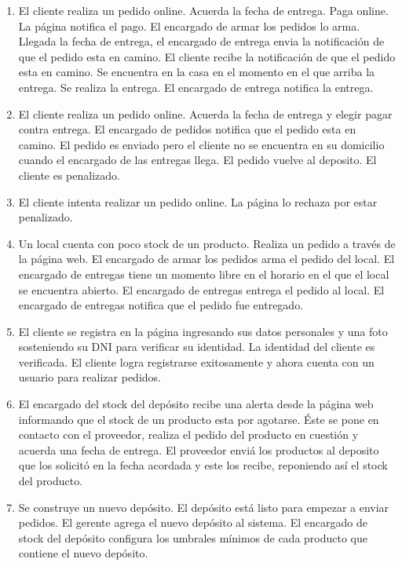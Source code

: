 \begin{enumerate}
\item El cliente realiza un pedido online. Acuerda la fecha de entrega. Paga online. La página notifica el pago. El encargado de armar los pedidos lo arma. Llegada la fecha de entrega, el encargado de entrega envia la notificación de que el pedido esta en camino. El cliente recibe la notificación de que el pedido esta en camino. Se encuentra en la casa en el momento en el que arriba la entrega. Se realiza la entrega. El encargado de entrega notifica la entrega.
\item El cliente realiza un pedido online. Acuerda la fecha de entrega y elegir pagar contra entrega. El encargado de pedidos notifica que el pedido esta en camino. El pedido es enviado pero el cliente no se encuentra en su domicilio cuando el encargado de las entregas llega. El pedido vuelve al deposito. El cliente es penalizado.
\item El cliente intenta realizar un pedido online. La página lo rechaza por estar penalizado.
\item Un local cuenta con poco stock de un producto. Realiza un pedido a través de la página web. El encargado de armar los pedidos arma el pedido del local. El encargado de entregas tiene un momento libre en el horario en el que el local se encuentra abierto. El encargado de entregas entrega el pedido al local. El encargado de entregas notifica que el pedido fue entregado.
\item El cliente se registra en la página ingresando sus datos personales y una foto sosteniendo su DNI para verificar su identidad. La identidad del cliente es verificada. El cliente logra registrarse exitosamente y ahora cuenta con un usuario para realizar pedidos. 
\item El encargado del stock del depósito recibe una alerta desde la página web informando que el stock de un producto esta por agotarse. Éste se pone en contacto con el proveedor, realiza el pedido del producto en cuestión y acuerda una fecha de entrega. El proveedor enviá los productos al deposito que los solicitó en la fecha acordada y este los recibe, reponiendo así el stock del producto.
\item Se construye un nuevo depósito. El depósito está listo para empezar a enviar pedidos. El gerente agrega el nuevo depósito al sistema. El encargado de stock del depósito configura los umbrales mínimos de cada producto que contiene el nuevo depósito.
\end{enumerate}
